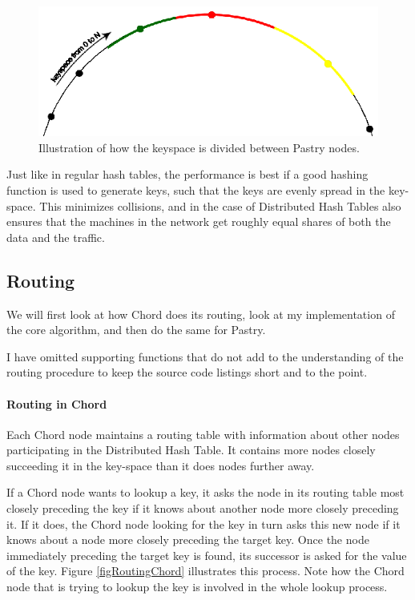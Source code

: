 \begin{figure}[!htb]
\begin{center}
	\includegraphics[width=0.9\linewidth]{illustrations/PastryKeySpace.eps}
  \caption{Illustration of how the keyspace is divided between Pastry nodes.}
  \label{figKeyspacePastry}
\end{center}
\end{figure}

Just like in regular hash tables, the performance is best if a good hashing function is used to generate keys, such that the keys are evenly spread in the key-space. This minimizes collisions, and in the case of Distributed Hash Tables also ensures that the machines in the network get roughly equal shares of both the data and the traffic.

\subsection{Routing}
We will first look at how Chord does its routing, look at my implementation of the core algorithm, and then do the same for Pastry.

I have omitted supporting functions that do not add to the understanding of the routing procedure to keep the source code listings short and to the point.


\paragraph{Routing in Chord}
Each Chord node maintains a routing table with information about other nodes participating in the Distributed Hash Table. It contains more nodes closely succeeding it in the key-space than it does nodes further away. 

If a Chord node wants to lookup a key, it asks the node in its routing table most closely preceding the key if it knows about another node more closely preceding it. If it does, the Chord node looking for the key in turn asks this new node if it knows about a node more closely preceding the target key. Once the node immediately preceding the target key is found, its successor is asked for the value of the key. Figure \ref{figRoutingChord} illustrates this process. Note how the Chord node that is trying to lookup the key is involved in the whole lookup process.

